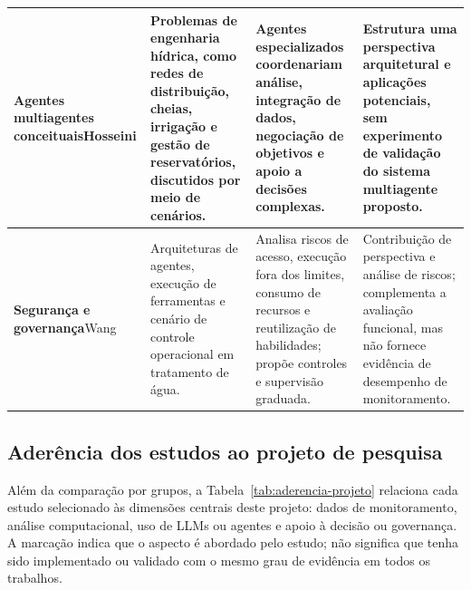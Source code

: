 \begin{longtable}{p{2.6cm}p{3.5cm}p{4.0cm}p{4.1cm}}
\hline
\textbf{Agentes multiagentes conceituais}\newline Hosseini & Problemas de engenharia hídrica, como redes de distribuição, cheias, irrigação e gestão de reservatórios, discutidos por meio de cenários. & Agentes especializados coordenariam análise, integração de dados, negociação de objetivos e apoio a decisões complexas. & Estrutura uma perspectiva arquitetural e aplicações potenciais, sem experimento de validação do sistema multiagente proposto. \\
\hline
\textbf{Segurança e governança}\newline Wang & Arquiteturas de agentes, execução de ferramentas e cenário de controle operacional em tratamento de água. & Analisa riscos de acesso, execução fora dos limites, consumo de recursos e reutilização de habilidades; propõe controles e supervisão graduada. & Contribuição de perspectiva e análise de riscos; complementa a avaliação funcional, mas não fornece evidência de desempenho de monitoramento. \\
\hline
\end{longtable}
\setlength{\tabcolsep}{6pt}
\renewcommand{\arraystretch}{1.0}
\normalsize
{}

\subsection{Aderência dos estudos ao projeto de pesquisa}
\label{subsec:aderencia-estudos}

Além da comparação por grupos, a Tabela~\ref{tab:aderencia-projeto} relaciona
cada estudo selecionado às dimensões centrais deste projeto: dados de
monitoramento, análise computacional, uso de LLMs ou agentes e apoio à decisão
ou governança. A marcação indica que o aspecto é abordado pelo estudo; não
significa que tenha sido implementado ou validado com o mesmo grau de evidência
em todos os trabalhos.


\begingroup

\footnotesize
\setlength{\tabcolsep}{3pt}
\renewcommand{\arraystretch}{1.18}

